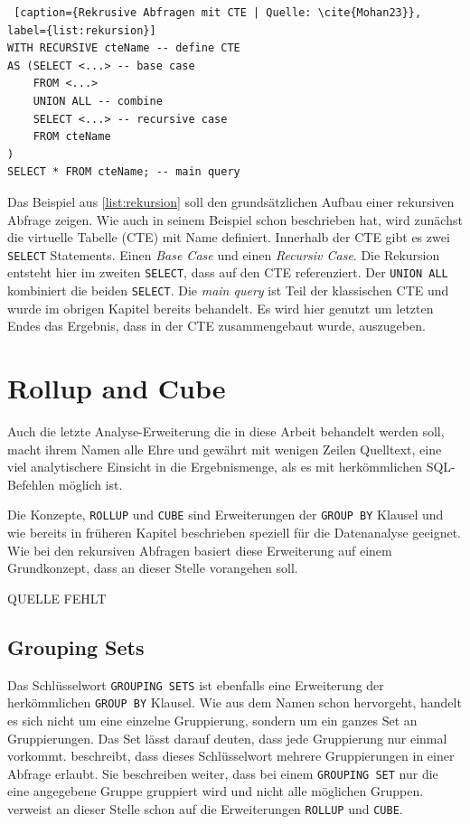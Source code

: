 \begin{lstlisting} [caption={Rekrusive Abfragen mit CTE | Quelle: \cite{Mohan23}}, label={list:rekursion}]
WITH RECURSIVE cteName -- define CTE
AS (SELECT <...> -- base case
	FROM <...>
	UNION ALL -- combine
	SELECT <...> -- recursive case
	FROM cteName
)
SELECT * FROM cteName; -- main query
\end{lstlisting}

Das Beispiel aus \ref{list:rekursion} soll den grundsätzlichen Aufbau einer rekursiven
Abfrage zeigen. Wie auch \cite{Mohan23} in seinem Beispiel schon beschrieben hat,
wird zunächst die virtuelle Tabelle (CTE) mit Name definiert. Innerhalb der CTE
gibt es zwei \texttt{SELECT} Statements. Einen \textit{Base Case} und einen \textit{Recursiv
Case}. Die Rekursion entsteht hier im zweiten \texttt{SELECT}, dass auf den CTE referenziert.
Der \texttt{UNION ALL} kombiniert die beiden \texttt{SELECT}. Die \textit{main
query} ist Teil der klassischen CTE und wurde im obrigen Kapitel bereits
behandelt. Es wird hier genutzt um letzten Endes das Ergebnis, dass in der CTE
zusammengebaut wurde, auszugeben.


\section{Rollup and Cube}
Auch die letzte Analyse-Erweiterung die in diese Arbeit behandelt werden soll, macht
ihrem Namen alle Ehre und gewährt mit wenigen Zeilen Quelltext, eine viel
analytischere Einsicht in die Ergebnismenge, als es mit herkömmlichen SQL-Befehlen
möglich ist.

Die Konzepte, \texttt{ROLLUP} und \texttt{CUBE} sind Erweiterungen der \texttt{GROUP
BY} Klausel und wie bereits in früheren Kapitel beschrieben speziell für die Datenanalyse
geeignet. Wie bei den rekursiven Abfragen basiert diese Erweiterung auf einem
Grundkonzept, dass an dieser Stelle vorangehen soll.

QUELLE FEHLT

\subsection{Grouping Sets}
Das Schlüsselwort \texttt{GROUPING SETS} ist ebenfalls eine Erweiterung der herkömmlichen
\texttt{GROUP BY} Klausel. Wie aus dem Namen schon hervorgeht, handelt es sich
nicht um eine einzelne Gruppierung, sondern um ein ganzes Set an Gruppierungen.
Das Set lässt darauf deuten, dass jede Gruppierung nur einmal vorkommt.
\cite{oracle16} beschreibt, dass dieses Schlüsselwort mehrere Gruppierungen in einer
Abfrage erlaubt. Sie beschreiben weiter, dass bei einem \texttt{GROUPING SET}
nur die eine angegebene Gruppe gruppiert wird und nicht alle möglichen Gruppen. \cite{oracle16}
verweist an dieser Stelle schon auf die Erweiterungen \texttt{ROLLUP} und
\texttt{CUBE}.

